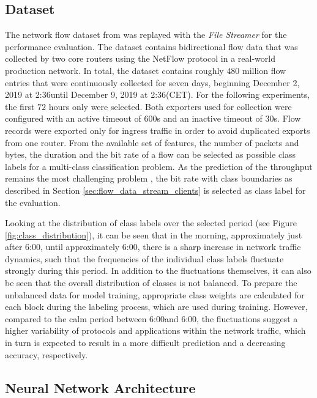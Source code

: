 \documentclass[conference]{IEEEtran}
\begin{document}
\subsection{Dataset} \label{sec:dataset}
The network flow dataset from \cite{hardegen_predicting_2020} was replayed with the \textit{File Streamer} for the performance evaluation. The dataset contains bidirectional flow data that was collected by two core routers using the NetFlow protocol \cite{rfc3954} in a real-world production network. In total, the dataset contains roughly $480$ million flow entries that were continuously collected for seven days, beginning December 2, 2019 at 2:36\PM until December 9, 2019 at 2:36\PM (CET). For the following experiments, the first $72$ hours only were selected. Both exporters used for collection were configured with an active timeout of $600$s and an inactive timeout of $30$s. Flow records were exported only for ingress traffic in order to avoid duplicated exports from one router. From the available set of features, the number of packets and bytes, the duration and the bit rate of a flow can be selected as possible class labels for a multi-class classification problem. As the prediction of the throughput remains the most challenging problem \cite{hardegen_predicting_2020}, the bit rate with class boundaries as described in Section \ref{sec:flow_data_stream_clients} is selected as class label for the evaluation. 

Looking at the distribution of class labels over the selected period (see Figure \ref{fig:class_distribution}), it can be seen that in the morning, approximately just after 6:00\AM, until approximately 6:00\PM, there is a sharp increase in network traffic dynamics, such that the frequencies of the individual class labels fluctuate strongly during this period. In addition to the fluctuations themselves, it can also be seen that the overall distribution of classes is not balanced. To prepare the unbalanced data for model training, appropriate class weights are calculated for each block during the labeling process, which are used during training. However, compared to the calm period between 6:00\PM and 6:00\AM, the fluctuations suggest a higher variability of protocols and applications within the network traffic, which in turn is expected to result in a more difficult prediction and a decreasing accuracy, respectively.

\subsection{Neural Network Architecture}
\end{document}
